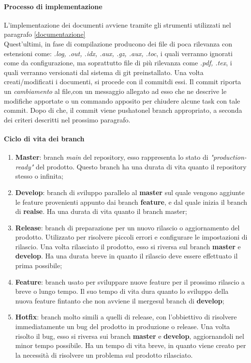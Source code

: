 	\paragraph{Processo di implementazione}
L'implementazione dei documenti avviene tramite gli strumenti utilizzati nel paragrafo \ref{documentazione}\\
Quest'ultimi, in fase di compilazione producono dei file di poca rilevanza con estensioni come: \textit{.log, .out, .idx, .aux, .gz, .aux, .toc},
i quali verranno ignorati come da configurazione, ma soprattutto file di più rilevanza
come \textit{.pdf, .tex}, i quali verranno versionati dal sistema di git preinstallato.  
Una volta creati/modificati i documenti, si procede con il commit\glossario di essi. Il commit riporta un \textit{cambiamento} al file,con un messaggio allegato ad esso che ne 
descrive le modifiche apportate o un commando apposito per chiudere alcune task con tale commit. Dopo di che, il commit viene pushato\glossario nel branch appropriato, 
a seconda dei criteri descritti nel prossimo paragrafo. 

\paragraph{Ciclo di vita dei branch}
\begin{enumerate}
	
	\item \textbf{Master}: branch \textit{main} del repository, esso rappresenta lo stato di \textit{"production-ready"} del prodotto. Questo branch ha una durata di vita quanto il repository stesso o infinita;
	\item \textbf{Develop}: branch di sviluppo parallelo al \textbf{master} sul quale vengono aggiunte le feature provenienti appunto dai branch \textbf{feature},
	 e dal quale inizia il branch di \textbf{realse}. Ha una durata di vita quanto il branch master;
	 
	\item \textbf{Release}: branch di preparazione per un nuovo rilascio o aggiornamento del prodotto. 
	Utilizzato per risolvere piccoli errori e configurare le impostazioni di rilascio. Una volta rilasciato il 
	prodotto, esso si riversa sul branch \textbf{master} e \textbf{develop}. Ha una durata breve in quanto il rilascio deve essere effettuato il prima possibile;

	\item \textbf{Feature}: branch usato per sviluppare nuove feature per il prossimo rilascio a breve o lungo tempo. Il suo tempo di vita dura quanto lo sviluppo della nuova feature
	fintanto che non avviene il merge\glossario sul branch di \textbf{develop};

	\item \textbf{Hotfix}: branch molto simili a quelli di release, con l'obbiettivo di risolvere immediatamente un bug del prodotto in produzione o release. Una volta risolto il bug, 
	esso si riversa sui branch \textbf{master} e \textbf{develop}, aggiornandoli nel minor tempo possibile. Ha un tempo di vita breve, in quanto viene creato per la necessità di risolvere 
	un problema sul prodotto rilasciato. 
	
\end{enumerate}

